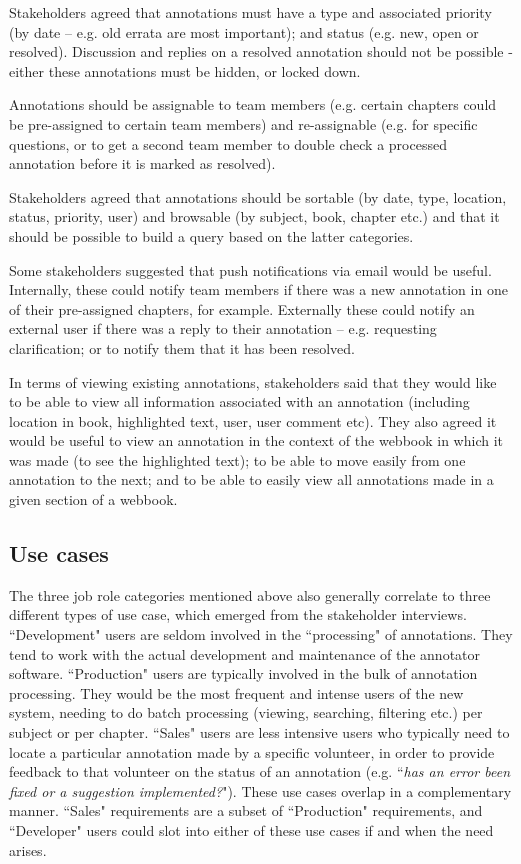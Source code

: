 Stakeholders agreed that annotations must have a type and associated priority (by date – e.g. old errata are most important); and status (e.g. new, open or resolved). Discussion and replies on a resolved annotation should not be possible - either these annotations must be hidden, or locked down. 

Annotations should be assignable to team members (e.g. certain chapters could be pre-assigned to certain team members) and re-assignable (e.g. for specific questions, or to get a second team member to double check a processed annotation before it is marked as resolved).

Stakeholders agreed that annotations should be sortable (by date, type, location, status, priority, user) and browsable (by subject, book, chapter etc.) and that it should be possible to build a query based on the latter categories.

Some stakeholders suggested that push notifications via email would be useful. Internally, these could notify team members if there was a new annotation in one of their pre-assigned chapters, for example. Externally these could notify an external user if there was a reply to their annotation – e.g. requesting clarification; or to notify them that it has been resolved.

In terms of viewing existing annotations, stakeholders said that they would like to be able to view all information associated with an annotation (including location in book, highlighted text, user, user comment etc). They also agreed it would be useful to view an annotation in the context of the webbook in which it was made (to see the highlighted text); to be able to move easily from one annotation to the next; and to be able to easily view all annotations made in a given section of a webbook.

\subsection{Use cases}
The three job role categories mentioned above also generally correlate to three different types of use case, which emerged from the stakeholder interviews. ``Development" users are seldom involved in the ``processing" of annotations. They tend to work with the actual development and maintenance of the annotator software. ``Production" users are typically involved in the bulk of annotation processing. They would be the most frequent and intense users of the new system, needing to do batch processing (viewing, searching, filtering etc.) per subject or per chapter. ``Sales" users are less intensive users who typically need to locate a particular annotation made  by a specific volunteer, in order to provide feedback to that volunteer on the status of an annotation (e.g. ``\textit{has an error been fixed or a suggestion implemented?}"). These use cases overlap in a complementary manner. ``Sales" requirements are a subset of ``Production" requirements, and ``Developer" users could slot into either of these use cases if and when the need arises. 

